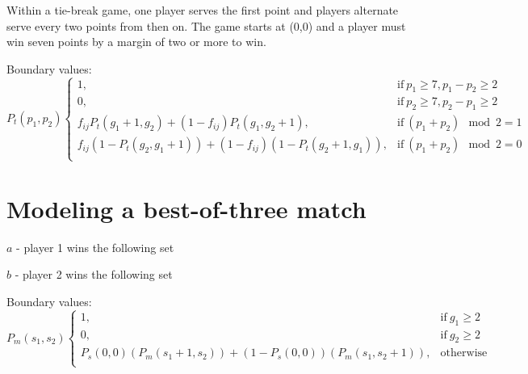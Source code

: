 \documentclass[chapterprefix=false]{report}
\begin{document}
Within a tie-break game, one player serves the first point and players alternate serve every two points from then on. The game starts at (0,0) and a player must win seven points by a margin of two or more to win.

Boundary values:
\begin{equation}
    P_t(p_1,p_2) 
    \begin{cases}
      1, & \text{if}\ p_1 \geq 7,p_1-p_2 \geq 2 \\
      0, & \text{if}\ p_2 \geq 7,p_2-p_1 \geq 2 \\
      f_{ij}P_t(g_1+1,g_2)+(1-f_{ij})P_t(g_1,g_2+1), & \text{if}\ (p_1+p_2) \mod 2 = 1 \\
f_{ij}(1-P_t(g_2,g_1+1))+(1-f_{ij})(1-P_t(g_2+1,g_1)), & \text{if}\ (p_1+p_2) \mod 2 = 0 \\
    \end{cases}
  \end{equation}

\section{Modeling a best-of-three match}


$a$ - player 1 wins the following set

$b$ - player 2 wins the following set


Boundary values:
\begin{equation}
    P_m(s_1,s_2) 
    \begin{cases}
      1, & \text{if}\ g_1 \geq 2 \\
      0, & \text{if}\ g_2 \geq 2 \\
      P_s(0,0)(P_m(s_1+1,s_2))+(1-P_s(0,0))(P_m(s_1,s_2+1)), & \text{otherwise}\ \\
    \end{cases}
  \end{equation}
\end{document}
